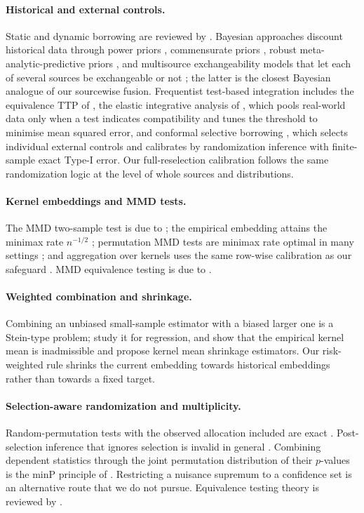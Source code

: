 \documentclass[11pt,a4paper]{article}
\begin{document}
\paragraph{Historical and external controls.} Static and dynamic borrowing are reviewed by \citet{viele2014}. Bayesian approaches discount historical data through power priors \citep{ibrahimchen2000}, commensurate priors \citep{hobbs2011}, robust meta-analytic-predictive priors \citep{schmidli2014}, and multisource exchangeability models that let each of several sources be exchangeable or not \citep{kaizer2018}; the latter is the closest Bayesian analogue of our sourcewise fusion. Frequentist test-based integration includes the equivalence TTP of \citet{li2020}, the elastic integrative analysis of \citet{yang2023elastic}, which pools real-world data only when a test indicates compatibility and tunes the threshold to minimise mean squared error, and conformal selective borrowing \citep{zhu2025}, which selects individual external controls and calibrates by randomization inference with finite-sample exact Type-I error. Our full-reselection calibration follows the same randomization logic at the level of whole sources and distributions.

\paragraph{Kernel embeddings and MMD tests.} The MMD two-sample test is due to \citet{gretton2012}; the empirical embedding attains the minimax rate $n^{-1/2}$ \citep{tolstikhin2017}; permutation MMD tests are minimax rate optimal in many settings \citep{kim2022}; and aggregation over kernels uses the same row-wise calibration as our safeguard \citep{schrab2023}. MMD equivalence testing is due to \citet{liugandy2026}.

\paragraph{Weighted combination and shrinkage.} Combining an unbiased small-sample estimator with a biased larger one is a Stein-type problem; \citet{chen2015} study it for regression, and \citet{muandet2016} show that the empirical kernel mean is inadmissible and propose kernel mean shrinkage estimators. Our risk-weighted rule shrinks the current embedding towards historical embeddings rather than towards a fixed target.

\paragraph{Selection-aware randomization and multiplicity.} Random-permutation tests with the observed allocation included are exact \citep{hemerik2018,phipson2010}. Post-selection inference that ignores selection is invalid in general \citep{leeb2005}. Combining dependent statistics through the joint permutation distribution of their $p$-values is the minP principle of \citet{westfallyoung1993}. Restricting a nuisance supremum to a confidence set \citep{bergerboos1994} is an alternative route that we do not pursue. Equivalence testing theory is reviewed by \citet{romano2005}.
\end{document}
